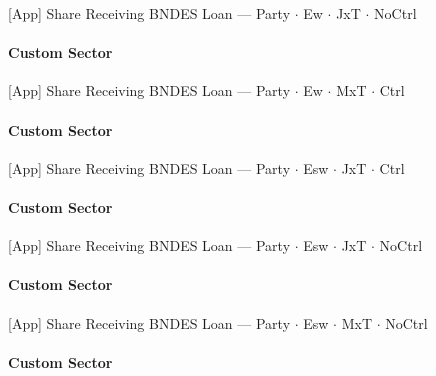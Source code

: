 \documentclass[aspectratio=169,10pt]{beamer}
\newcommand{\tgroup}{../tables/agg_firm_grouped}
\begin{document}
\begin{frame}[t,shrink=5]{[App] Share Receiving BNDES Loan --- Party $\cdot$ Ew $\cdot$ JxT $\cdot$ NoCtrl}
\framesubtitle{Custom Sector}
\begin{center}\footnotesize

\end{center}
\end{frame}

\begin{frame}[t,shrink=5]{[App] Share Receiving BNDES Loan --- Party $\cdot$ Ew $\cdot$ MxT $\cdot$ Ctrl}
\framesubtitle{Custom Sector}
\begin{center}\footnotesize

\end{center}
\end{frame}

\begin{frame}[t,shrink=5]{[App] Share Receiving BNDES Loan --- Party $\cdot$ Esw $\cdot$ JxT $\cdot$ Ctrl}
\framesubtitle{Custom Sector}
\begin{center}\footnotesize

\end{center}
\end{frame}

\begin{frame}[t,shrink=5]{[App] Share Receiving BNDES Loan --- Party $\cdot$ Esw $\cdot$ JxT $\cdot$ NoCtrl}
\framesubtitle{Custom Sector}
\begin{center}\footnotesize

\end{center}
\end{frame}

\begin{frame}[t,shrink=5]{[App] Share Receiving BNDES Loan --- Party $\cdot$ Esw $\cdot$ MxT $\cdot$ NoCtrl}
\framesubtitle{Custom Sector}
\begin{center}\footnotesize

\end{center}
\end{frame}
\end{document}
